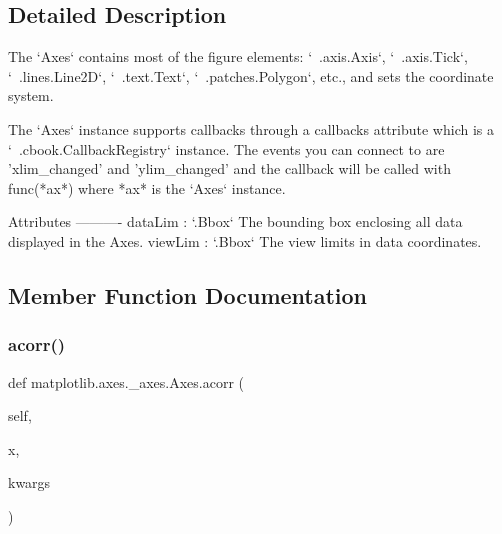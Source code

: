 \subsection{Detailed Description}
\begin{DoxyVerb}The `Axes` contains most of the figure elements: `~.axis.Axis`,
`~.axis.Tick`, `~.lines.Line2D`, `~.text.Text`, `~.patches.Polygon`, etc.,
and sets the coordinate system.

The `Axes` instance supports callbacks through a callbacks attribute which
is a `~.cbook.CallbackRegistry` instance.  The events you can connect to
are 'xlim_changed' and 'ylim_changed' and the callback will be called with
func(*ax*) where *ax* is the `Axes` instance.

Attributes
----------
dataLim : `.Bbox`
    The bounding box enclosing all data displayed in the Axes.
viewLim : `.Bbox`
    The view limits in data coordinates.\end{DoxyVerb}
 

\subsection{Member Function Documentation}
\mbox{\label{classmatplotlib_1_1axes_1_1__axes_1_1Axes_a542b7fad852ef55ddda7047afdf6741d}} 
\subsubsection{\texorpdfstring{acorr()}{acorr()}}
{\footnotesize\ttfamily def matplotlib.\+axes.\+\_\+axes.\+Axes.\+acorr (\begin{DoxyParamCaption}\item[{}]{self,  }\item[{}]{x,  }\item[{}]{kwargs }\end{DoxyParamCaption})}

